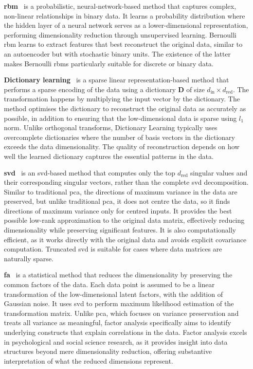     \noindent \textbf{\Gls{rbm}}~\citep{HinEtAl06} is a probabilistic, neural-network-based method that captures complex, non-linear relationships in binary data. It learns a probability distribution where the hidden layer of a neural network serves as a lower-dimensional representation, performing dimensionality reduction through unsupervised learning. Bernoulli \gls{rbm} learns to extract features that best reconstruct the original data, similar to an autoencoder but with stochastic binary units. The existence of the latter  makes Bernoulli \glspl{rbm} particularly suitable for discrete or binary data.

    \noindent \textbf{Dictionary learning}~\citep{MaiEtAl09} is a sparse linear representation-based method that performs a sparse encoding of the data using a dictionary $\mathbf{D}$ of size $d_{\mathrm{in}}\times d_{\mathrm{red}}$. The transformation happens by multiplying the input vector by the dictionary. The method optimises the dictionary to reconstruct the original data as accurately as possible, in addition to ensuring that the low-dimensional data is sparse using $l_1$ norm. Unlike orthogonal transforms, Dictionary Learning typically uses overcomplete dictionaries where the number of basis vectors in the dictionary exceeds the data dimensionality. The quality of reconstruction depends on how well the learned dictionary captures the essential patterns in the data.

    \noindent \textbf{\Gls{svd}}~\citep{HalEtAl11} is an \gls{svd}-based method that computes only the top $d_{\mathrm{red}}$ singular values and their corresponding singular vectors, rather than the complete \gls{svd} decomposition. Similar to traditional \gls{pca}, the directions of maximum variance in the data are preserved, but unlike traditional \gls{pca}, it does not centre the data, so it finds directions of maximum variance only for centred inputs. It provides the best possible low-rank approximation to the original data matrix, effectively reducing dimensionality while preserving significant features. It is also computationally efficient, as it works directly with the original data and avoids explicit covariance computation. Truncated \gls{svd} is suitable for cases where data matrices are naturally sparse.

    \noindent \textbf{\Gls{fa}}~\citep{Barber12} is a statistical method that reduces the dimensionality by preserving the common factors of the data. Each data point is assumed to be a linear transformation of the low-dimensional latent factors, with the addition of Gaussian noise. It uses \gls{svd} to perform maximum likelihood estimation of the transformation matrix. Unlike \gls{pca}, which focuses on variance preservation and treats all variance as meaningful, factor analysis specifically aims to identify underlying constructs that explain correlations in the data. Factor analysis excels in psychological and social science research, as it provides insight into data structures beyond mere dimensionality reduction, offering substantive interpretation of what the reduced dimensions represent.

